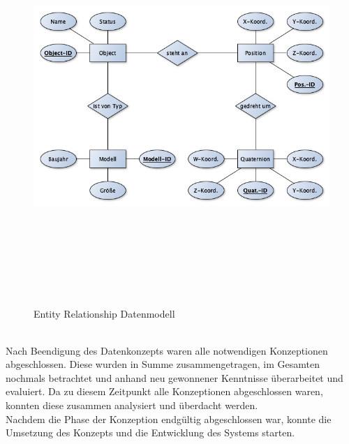 \begin{figure}[hbt!]
    \centering
    \includegraphics[width=15cm,height=15cm,keepaspectratio]{3Konzeption/Bilder/ERM_BA.png}
    \caption{Entity Relationship Datenmodell}
    \label{pic:erm}
\end{figure}
\\
Nach Beendigung des Datenkonzepts waren alle notwendigen Konzeptionen abgeschlossen. Diese wurden in Summe zusammengetragen, im Gesamten nochmals 
betrachtet und anhand neu gewonnener Kenntnisse überarbeitet und evaluiert. Da zu diesem Zeitpunkt alle Konzeptionen abgeschlossen 
waren, konnten diese zusammen analysiert und überdacht werden. 
\\ 
\linebreak
Nachdem die Phase der Konzeption endgültig abgeschlossen war, konnte die Umsetzung des Konzepts und die Entwicklung des Systems starten. 